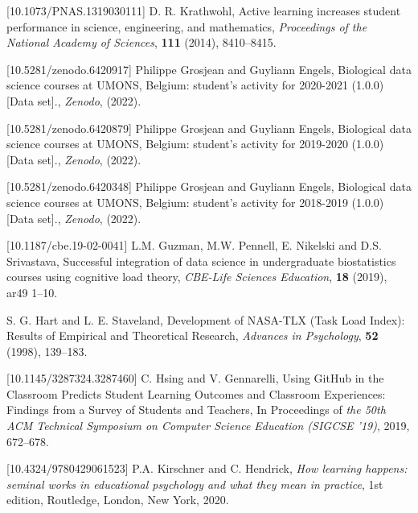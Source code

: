 \documentclass{aims}
\theoremstyle{definition}
\begin{document}
\begin{thebibliography}{99}
 [10.1073/PNAS.1319030111]
     \newblock  D. R. Krathwohl,
     \newblock Active learning increases student performance in science, engineering, and mathematics,
     \newblock \emph{Proceedings of the National Academy of Sciences}, \textbf{111} (2014), 8410--8415.

 [10.5281/zenodo.6420917]
     \newblock Philippe Grosjean and Guyliann Engels,
     \newblock Biological data science courses at UMONS, Belgium: student's activity for 2020-2021 (1.0.0) [Data set].,
     \newblock \emph{Zenodo}, (2022).

 [10.5281/zenodo.6420879]
     \newblock Philippe Grosjean and Guyliann Engels,
     \newblock Biological data science courses at UMONS, Belgium: student's activity for 2019-2020 (1.0.0) [Data set].,
     \newblock \emph{Zenodo}, (2022).

 [10.5281/zenodo.6420348]
     \newblock Philippe Grosjean and Guyliann Engels,
     \newblock Biological data science courses at UMONS, Belgium: student's activity for 2018-2019 (1.0.0) [Data set].,
     \newblock \emph{Zenodo}, (2022).

 [10.1187/cbe.19-02-0041]
     \newblock L.M. Guzman, M.W. Pennell, E. Nikelski and D.S. Srivastava,
     \newblock Successful integration of data science in undergraduate biostatistics courses using cognitive load theory,
     \newblock \emph{CBE-Life Sciences Education}, \textbf{18} (2019), ar49 1--10.

     \newblock S. G. Hart and L. E. Staveland,
     \newblock Development of NASA-TLX (Task Load Index): Results of Empirical and Theoretical Research,
     \newblock \emph{Advances in Psychology}, \textbf{52} (1998), 139--183.

 [10.1145/3287324.3287460]
     \newblock C. Hsing and V. Gennarelli,
     \newblock Using GitHub in the Classroom Predicts Student Learning Outcomes and Classroom Experiences: Findings from a Survey of Students and Teachers,
     \newblock In Proceedings of \emph{the 50th ACM Technical Symposium on Computer Science Education (SIGCSE '19)}, 2019, 672–678.

 [10.4324/9780429061523]
     \newblock P.A. Kirschner and C. Hendrick,
     \newblock \emph{How learning happens: seminal works in educational psychology and what they mean in practice},
     \newblock 1st edition, Routledge, London, New York, 2020.


\end{thebibliography}
\end{document}
